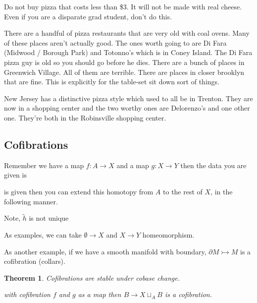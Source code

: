 \documentclass[10pt]{article}
\newtheorem{theorem}{Theorem}[section]
\theoremstyle{definition}
\begin{document}
	Do not buy pizza that costs less than \$3. It will not be made with real cheese. Even if you are a disparate grad student, don't do this.
	
	There are a handful of pizza restaurants that are very old with coal ovens. Many of these places aren't actually good. The ones worth going to are Di Fara (Midwood / Borough Park) and Totonno's which is in Coney Island. The Di Fara pizza guy is old so you should go before he dies. There are a bunch of places in Greenwich Village. All of them are terrible. There are places in closer brooklyn that are fine. This is explicitly for the table-set sit down sort of things. 
	
	New Jersey has a distinctive pizza style which used to all be in Trenton. They are now in a shopping center and the two worthy ones are Delorenzo's and one other one. They're both in the Robinsville shopping center. 
	
	
	\subsection{Cofibrations}
	Remember we have a map $f:A \to X$ and a map $g:X\to Y$ then the data you are given is 
	\begin{center}
	\end{center}
	is given then you can extend this homotopy from $A$ to the rest of $X$,  in the following manner.
	\begin{center}
\end{center}
	Note, $\tilde h$ is not unique
	
	As examples, we can take $\emptyset \to X$ and $X\to Y$ homeomorphism. 
	
	As another example, if we have a smooth manifold with boundary, $\partial M\rightarrowtail M$ is a cofibration (collars). 
	\begin{theorem}
		Cofibrations are stable under cobase change.
		with cofibration $f$ and $g$ as a map then $B\to X\sqcup_A B$ is a cofibration. 
	\end{theorem}
	
\end{document}
